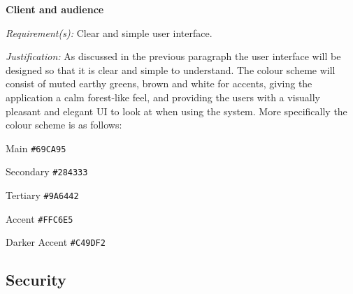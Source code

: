 \textsf{\bfseries Client and audience} \\ \vspace{0.1cm}

\textit{Requirement(s):} Clear and simple user interface.\\ \vspace{0.1cm}

\textit{Justification:}
As discussed in the previous paragraph the user interface will
be designed so that it is clear and simple to understand. The
colour scheme will consist of muted earthy greens, brown and
white for accents, giving the application a calm forest-like
feel, and providing the users with a visually pleasant and
elegant UI to look at when using the system. More specifically
the colour scheme is as follows:\\ \vspace{0.2cm}

\hspace{\parindent} \quad Main \texttt{\#69CA95}\\
\vspace{0.2cm}

\hspace{\parindent} \quad Secondary \texttt{\#284333}\\
\vspace{0.2cm}

\hspace{\parindent} \quad Tertiary \texttt{\#9A6442}\\
\vspace{0.2cm}

\hspace{\parindent} \quad Accent \texttt{\#FFC6E5}\\
\vspace{0.2cm}

\hspace{\parindent} \quad Darker Accent \texttt{\#C49DF2}\\
\vspace{0.2cm}

\subsection{Security}

